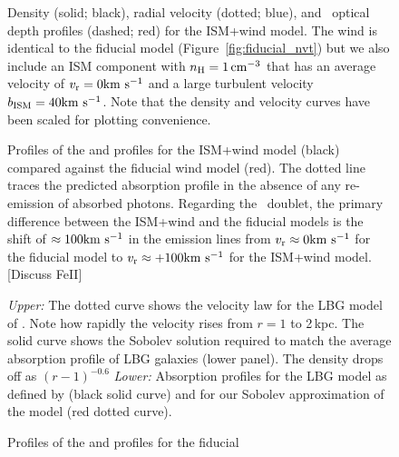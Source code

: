 \documentclass[12pt,preprint]{aastex}
\begin{document}
\begin{figure}
\caption{
Density (solid; black), radial velocity (dotted; blue), and
\mgiia\ optical depth profiles (dashed; red) for the ISM+wind
model.  The wind is identical to the fiducial model
(Figure~\ref{fig:fiducial_nvt}) but we also include an ISM component
with $n_{\rm H} = 1 \, {\rm cm^{-3}}$ that has an average velocity of $v_{\rm r} = 0
{\rm km~s^{-1}}$ and a large turbulent velocity $b_{\rm ISM} = 40 {\rm km~s^{-1}}$.
Note that the density and velocity curves have been scaled for plotting
convenience.  
}
\label{fig:ISM}
\end{figure}

\begin{figure}
\caption{
Profiles of the  and  profiles for the ISM+wind
model (black) compared against the fiducial wind model (red). 
The dotted line traces the predicted absorption profile in the absence
of any re-emission of absorbed photons.
Regarding the ~doublet, the primary difference between the
ISM+wind and the fiducial models is the shift of $\approx 100 {\rm km~s^{-1}}$
in the emission lines from $v_{\rm r} \approx 0 {\rm km~s^{-1}}$ for the fiducial
model to $v_{\rm r} \approx +100{\rm km~s^{-1}}$ for the ISM+wind model. 
[Discuss FeII]
}
\label{fig:ISM_spec}
\end{figure}

\begin{figure}
\caption{
{\it Upper:} The dotted curve shows the velocity law for the LBG model
of \cite{steidel+10}.  Note how rapidly the velocity rises from $r =
1$ to 2\,kpc.  The solid curve shows the Sobolev solution required to
match the average absorption profile of LBG galaxies (lower panel).
The density drops off as $(r-1)^{-0.6}$ 
{\it Lower:} Absorption profiles for the LBG model as defined by
\cite{steidel+10} (black solid curve) and for our Sobolev approximation of
the model (red dotted curve).  
}
\label{fig:LBG_Sobolev}
\end{figure}

\begin{figure}
\caption{
Profiles of the  and  profiles for the fiducial
}
\label{fig:LBG_spec}
\end{figure}
\end{document}
